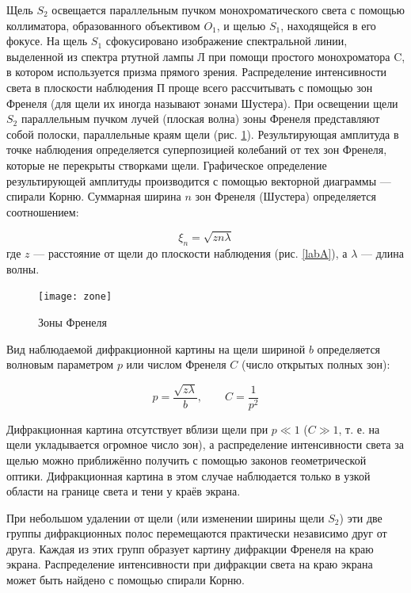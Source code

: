 \documentclass[a4paper,12pt]{article}
\begin{document}
Щель $ S_2 $ освещается параллельным пучком монохроматического света с помощью коллиматора, образованного объективом $ O_1 $, и щелью $S_1$, находящейся в его фокусе. На щель $ S_1 $ сфокусировано изображение спектральной линии, выделенной из спектра ртутной лампы Л при помощи простого монохроматора C, в котором используется призма прямого зрения. Распределение интенсивности света в плоскости наблюдения П проще всего рассчитывать с помощью зон Френеля (для щели их иногда называют зонами Шустера). При освещении щели $ S_2 $ параллельным пучком лучей (плоская волна) зоны Френеля представляют собой полоски, параллельные краям щели (рис. \ref{zone}). Результирующая амплитуда в точке наблюдения определяется суперпозицией колебаний от тех зон Френеля, которые не перекрыты створками щели. Графическое определение результирующей амплитуды производится с помощью векторной диаграммы --- спирали Корню. Суммарная ширина $ n $ зон Френеля (Шустера) определяется соотношением:

\begin{equation}\label{xin}
\xi_n = \sqrt{zn\lambda}
\end{equation}
где $ z $ --- расстояние от щели до плоскости наблюдения (рис. \ref{labA}), а $ \lambda $ --- длина волны.

\begin{figure}[h!]
	\begin{center}
		\texttt{[image: zone]}
	\end{center}
	\caption{Зоны Френеля}
	\label{zone}
\end{figure}

Вид наблюдаемой дифракционной картины
на щели шириной $ b $ определяется волновым параметром $ p $ или числом Френеля $ C $ (число открытых полных зон):


\begin{equation}\label{}
p = \dfrac{\sqrt{z \lambda}}{b}, \qquad C = \dfrac{1}{p^2}
\end{equation}

Дифракционная картина отсутствует вблизи щели при $ p \ll 1 $ ($ C \gg 1 $, т. е. на щели укладывается огромное число зон), а распределение интенсивности света за щелью можно приближённо получить с помощью законов геометрической оптики. Дифракционная картина в этом случае наблюдается только в узкой области на границе света и тени у краёв экрана.

При небольшом удалении от щели (или изменении ширины щели $ S_2 $) эти две группы дифракционных полос перемещаются практически независимо друг от друга. Каждая из этих групп образует картину дифракции Френеля на краю экрана. Распределение интенсивности при дифракции света на краю экрана может быть найдено с помощью спирали Корню.
\end{document}
